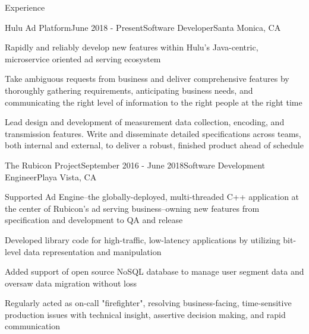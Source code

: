 \documentclass{resume} %
\begin{document}
\begin{rSection}{Experience}

\begin{rSubsection}{Hulu Ad Platform}{June 2018 - Present}{Software Developer}{Santa Monica, CA}
\item Rapidly and reliably develop new features within Hulu's Java-centric, microservice oriented ad serving ecosystem
\item Take ambiguous requests from business and deliver comprehensive features by thoroughly gathering requirements, anticipating business needs, and communicating the right level of information to the right people at the right time
\item Lead design and development of measurement data collection, encoding, and transmission features. Write and disseminate detailed specifications across teams, both internal and external, to deliver a robust, finished product ahead of schedule
\end{rSubsection}

\begin{rSubsection}{The Rubicon Project}{September 2016 - June 2018}{Software Development Engineer}{Playa Vista, CA}
\item Supported Ad Engine--the globally-deployed, multi-threaded C++ application at the center of Rubicon's ad serving business--owning new features from specification and development to QA and release
\item Developed library code for high-traffic, low-latency applications by utilizing bit-level data representation and manipulation
\item Added support of open source NoSQL database to manage user segment data and oversaw data migration without loss
\item Regularly acted as on-call "firefighter", resolving business-facing, time-sensitive production issues with technical insight, assertive decision making, and rapid communication
\end{rSubsection}


\end{rSection}
\end{document}
